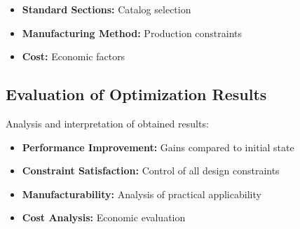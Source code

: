 \begin{itemize}
    \item \textbf{Standard Sections:} Catalog selection
    \item \textbf{Manufacturing Method:} Production constraints
    \item \textbf{Cost:} Economic factors
\end{itemize}


\subsection{Evaluation of Optimization Results}
Analysis and interpretation of obtained results:

\begin{tcolorbox}[title=Evaluation Criteria]
\begin{itemize}
    \item \textbf{Performance Improvement:} Gains compared to initial state
    \item \textbf{Constraint Satisfaction:} Control of all design constraints
    \item \textbf{Manufacturability:} Analysis of practical applicability
    \item \textbf{Cost Analysis:} Economic evaluation
\end{itemize}
\end{tcolorbox} 